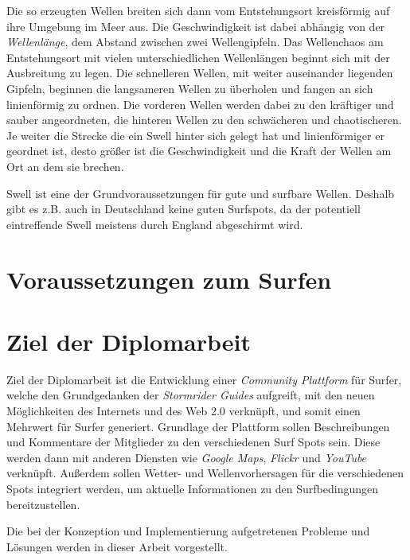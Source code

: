 Die so erzeugten Wellen breiten sich dann vom Entstehungsort
kreisförmig auf ihre Umgebung im Meer aus. Die Geschwindigkeit ist
dabei abhängig von der \textit{Wellenlänge}, dem Abstand zwischen zwei
Wellengipfeln. Das Wellenchaos am Entstehungsort mit vielen
unterschiedlichen Wellenlängen beginnt sich mit der Ausbreitung zu
legen. Die schnelleren Wellen, mit weiter auseinander liegenden
Gipfeln, beginnen die langsameren Wellen zu überholen und fangen an
sich linienförmig zu ordnen. Die vorderen Wellen werden dabei zu den
kräftiger und sauber angeordneten, die hinteren Wellen zu den
schwächeren und chaotischeren. Je weiter die Strecke die ein Swell
hinter sich gelegt hat und linienförmiger er geordnet ist, desto
größer ist die Geschwindigkeit und die Kraft der Wellen am Ort an dem
sie brechen.

Swell ist eine der Grundvoraussetzungen für gute und surfbare
Wellen. Deshalb gibt es z.B. auch in Deutschland keine guten
Surfspots, da der potentiell eintreffende Swell meistens durch England
abgeschirmt wird.

\section{Voraussetzungen zum Surfen}

\section{Ziel der Diplomarbeit}

Ziel der Diplomarbeit ist die Entwicklung einer \textit{Community
  Plattform} für Surfer, welche den Grundgedanken der
\textit{Stormrider Guides} aufgreift, mit den neuen Möglichkeiten des
Internets und des Web 2.0 verknüpft, und somit einen Mehrwert für
Surfer generiert. Grundlage der Plattform sollen Beschreibungen und
Kommentare der Mitglieder zu den verschiedenen Surf Spots sein. Diese
werden dann mit anderen Diensten wie \textit{Google Maps},
\textit{Flickr} und \textit{YouTube} verknüpft. Außerdem sollen
Wetter- und Wellenvorhersagen für die verschiedenen Spots integriert
werden, um aktuelle Informationen zu den Surfbedingungen
bereitzustellen.

Die bei der Konzeption und Implementierung aufgetretenen Probleme und
Lösungen werden in dieser Arbeit vorgestellt.



% 

